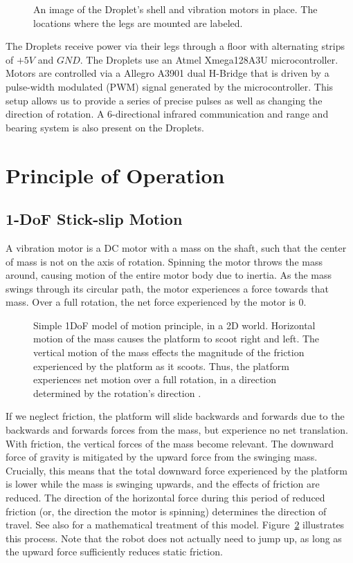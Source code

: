 \documentclass[letterpaper, 10pt, conference]{ieeeconf}
\begin{document}
\begin{figure}[!htb]
	\centering
	
	\caption{An image of the Droplet's shell and vibration motors in place. The locations where the legs are mounted are labeled.}
	\label{fig:PWMs}
\end{figure}

The Droplets receive power via their legs through a floor with alternating strips of $+5V$ and $GND$. The Droplets use an Atmel Xmega128A3U microcontroller. Motors are controlled via a Allegro A3901 dual H-Bridge that is driven by a pulse-width modulated (PWM) signal generated by the microcontroller. This setup allows us to provide a series of precise pulses as well as changing the direction of rotation. A 6-directional infrared communication and range and bearing system \cite{farrow14} is also present on the Droplets.


\section{Principle of Operation}

\subsection{1-DoF Stick-slip Motion}
A vibration motor is a DC motor with a mass on the shaft, such that the center of mass is not on the axis of rotation. Spinning the motor throws the mass around, causing motion of the entire motor body due to inertia. As the mass swings through its circular path, the motor experiences a force towards that mass. Over a full rotation, the net force experienced by the motor is 0.

\begin{figure}[!htb]
\centering

\caption{Simple 1DoF model of motion principle, in a 2D world. Horizontal motion of the mass causes the platform to scoot right and left. The vertical motion of the mass effects the magnitude of the friction experienced by the platform as it scoots. Thus, the platform experiences net motion over a full rotation, in a direction determined by the rotation's direction \cite{Vartholomeos2005}.}
\label{motorDiagram}
\end{figure}

If we neglect friction, the platform will slide backwards and forwards due to the backwards and forwards forces from the mass, but experience no net translation. With friction, the vertical forces of the mass become relevant. The downward force of gravity is mitigated by the upward force from the swinging mass. Crucially, this means that the total downward force experienced by the platform is lower while the mass is swinging upwards, and the effects of friction are reduced. The direction of the horizontal force during this period of reduced friction (or, the direction the motor is spinning) determines the direction of travel. See also \cite{Vartholomeos2005,Vartholomeos2006} for a mathematical treatment of this model. Figure~\ref{motorDiagram} illustrates this process. Note that the robot does not actually need to jump up, as long as the upward force sufficiently reduces static friction. 
\end{document}
